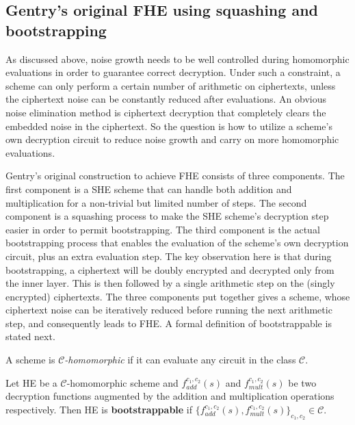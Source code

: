 \documentclass[../main.tex]{subfiles}
\begin{document}
\subsection{Gentry's original FHE using squashing and bootstrapping}\label{subsec:gentry bootstrap}



As discussed above, noise growth needs to be well controlled during homomorphic evaluations in order to guarantee correct decryption. Under such a constraint, a scheme can only perform a certain number of arithmetic on ciphertexts, unless the ciphertext noise can be constantly reduced after evaluations. An obvious noise elimination method is ciphertext decryption that completely clears the embedded noise in the ciphertext. So the question is how to utilize a scheme's own decryption circuit to reduce noise growth and carry on more homomorphic evaluations.

Gentry's original construction to achieve FHE consists of three components. The first component is a SHE scheme that can handle both addition and multiplication for a non-trivial but limited number of steps. The second component is a squashing process to make the SHE scheme's decryption step easier in order to permit bootstrapping. The third component is the actual bootstrapping process that enables the evaluation of the scheme's own decryption circuit, plus an extra evaluation step. The key observation here is that during bootstrapping, a ciphertext will be doubly encrypted and  decrypted only from the inner layer. This is then followed by a single arithmetic step on the (singly encrypted) ciphertexts. The three components put together gives a scheme, whose ciphertext noise can be iteratively reduced before running the next arithmetic step, and consequently leads to FHE. A formal definition of bootstrappable is stated next. 

\begin{definition}
A scheme is \textit{$\mathcal{C}$-homomorphic} if it can evaluate any circuit in the class $\mathcal{C}$.
\end{definition}

\begin{definition}
\label{def:bootstrappable}
Let HE be a $\mathcal{C}$-homomorphic scheme and $f_{add}^{c_1,c_2}(s)$ and $f_{mult}^{c_1,c_2}(s)$ be two decryption functions augmented by the addition and multiplication operations respectively. Then HE is \textbf{bootstrappable} if $\{f_{add}^{c_1,c_2}(s), f_{mult}^{c_1,c_2}(s)\}_{c_1,c_2} \in \mathcal{C}$.
\end{definition}
\end{document}
